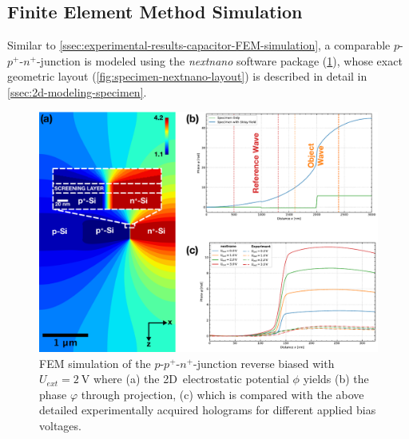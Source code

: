 \subsection{Finite Element Method Simulation} \label{ssec:experimental-results-pnjunction-FEM-simulation}
Similar to \cref{ssec:experimental-results-capacitor-FEM-simulation}, a comparable $p$-$p^+$-$n^+$-junction is modeled using the \emph{nextnano} software package (\cref{fig:pn-junction-FEM-EH-linescan-comparison}), whose exact geometric layout (\cref{fig:specimen-nextnano-layout}) is described in detail in \cref{ssec:2d-modeling-specimen}.
\begin{figure}[H]
	\centering
	\includegraphics[width=\textwidth]{Figures/Results/pn-Junction/Simulations/pn-junction-FEM-EH-linescan-comparison.pdf}
	\caption{FEM simulation of the $p$-$p^+$-$n^+$-junction reverse biased with $U_{\mathit{ext}} = \SI{2}{\volt}$ where (a) the 2D~electrostatic potential $\phi$ yields (b) the phase $\varphi$ through projection, (c) which is compared with the above detailed experimentally acquired holograms for different applied bias voltages.}
	\label{fig:pn-junction-FEM-EH-linescan-comparison}
\end{figure}
